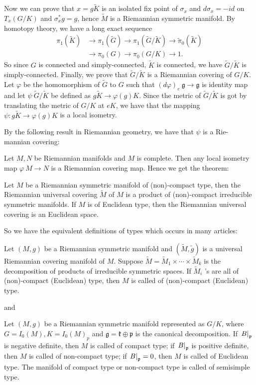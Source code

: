 Now we can prove that $x = g \tilde{K}$ is an isolated fix point
of $\sigma_{x}$ and $d \sigma_{x} = -i d$ on $T_{x}(G / K)$ and
$\sigma_{x}^{*} g = g$, hence $\tilde{M}$ is a Riemannian
symmetric manifold. By homotopy theory, we have a long exact
sequence
\[
\begin{aligned}
	\pi_{1}(\tilde{K}) & \rightarrow \pi_{1}(\tilde{G})
	\rightarrow \pi_{1}(\tilde{G} / \tilde{K}) \rightarrow
	\tilde{\pi}_{0}(\tilde{K}) \\
	& \rightarrow \pi_{0}(G) \rightarrow \pi_{0}(G / K)
	\rightarrow 1.
\end{aligned}
\]
So since $G$ is connected and simply-connected, $\tilde{K}$ is
connected, we have $\tilde{G} / \tilde{K}$ is simply-connected.
Finally, we prove that $\tilde{G} / \tilde{K}$ is a Riemannian
covering of $G / K$. Let $\varphi$ be the homomorphism of
$\tilde{G}$ to $G$ such that $(d \varphi)_{e}\: \mathfrak{g}
\rightarrow \mathfrak{g}$ is identity map and let $\psi\:
\tilde{G} / \tilde{K}$ be defined as $g \tilde{K} \rightarrow
\varphi(g) K$.
Since the metric of $\tilde{G} / \tilde{K}$ is got by
translating the metric of $G / K$ at $e K$, we have that the
mapping $\psi: g \tilde{K} \rightarrow \varphi(g) K$ is a local
isometry.

By the following result in Riemannian geometry, we have that
$\psi$ is a Rie-
mannian covering:

 Let $M, N$ be Riemannian manifolds and $M$ is complete. Then
 any local
isometry map $\varphi\: M \rightarrow N$ is a Riemannian
covering map.
\eproof
Hence we get the theorem:
\begin{theorem}
	Let $M$ be a Riemannian symmetric manifold of (non)-compact
	type, then the Riemannian universal covering $\tilde{M}$ of
	$M$ is a product of (non)-compact irreducible symmetric
	manifolds. If $M$ is of Euclidean type, then the Riemannian
	universal covering is an Euclidean space.
\end{theorem}

So we have the equivalent definitions of types which occurs in
many articles:

\begin{definition}
	Let $(M, g)$ be a Riemannian symmetric manifold and
	$(\tilde{M}, \tilde{g})$ is a universal Riemannian covering
	manifold of $M$. Suppose $\tilde M = \tilde M_{1} \times
	\cdots \times \tilde M_{k}$ is the decomposition of products
	of irreducible symmetric spaces. If $\tilde M_{i}$ 's are
	all of (non)-compact (Euclidean) type, then $M$ is called of
	(non)-compact
	(Euclidean) type.
\end{definition}
and
\begin{definition}
	Let $(M, g)$ be a Riemannian symmetric manifold represented
	as $G / K$, where $G = I_{0}(M), K = I_0(M)_p$ and
	$\mathfrak{g} = \mathfrak{k}\oplus\mathfrak{p}$ is the
	canonical decomposition. If $\left.B\right|_{{\mathfrak p}}$ is
	negative definite, then $M$ is called of compact type; if
	$\left.B\right|_{{\mathfrak p}}$ is positive definite, then $M$ is
	called of non-compact type; if $\left.B\right|_{{\mathfrak p}} = 0$,
	then $M$ is called of Euclidean type. The manifold of
	compact type or non-compact type is called of semisimple
	type.
\end{definition}

